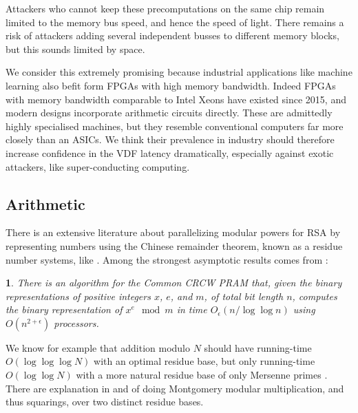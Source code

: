 \documentclass{article}
\newtheorem*{rawnamedtheorem}{\therawnamedtheorem}
\newcommand{\therawnamedtheorem}{\error}
\newenvironment{namedtheorem}[1]{\renewcommand{\therawnamedtheorem}{#1}
   \begin{rawnamedtheorem}}
  {\end{rawnamedtheorem}}
\begin{document}
Attackers who cannot keep these precomputations on the same chip remain
limited to the memory bus speed, and hence the speed of light. 
There remains a risk of attackers adding several independent busses to
different memory blocks, but this sounds limited by space.

We consider this extremely promising because industrial applications
like machine learning also befit form FPGAs with high memory bandwidth.
Indeed FPGAs with memory bandwidth comparable to Intel Xeons have
existed since 2015, and 
modern designs incorporate arithmetic circuits directly.
These are admittedly highly specialised machines, but they resemble
conventional computers far more closely than an ASICs.
We think their prevalence in industry should therefore increase
confidence in the VDF latency dramatically, especially against
exotic attackers, like super-conducting computing.

\subsection{Arithmetic}

There is an extensive literature about parallelizing modular powers
for RSA by representing numbers using the Chinese remainder theorem,
known as a residue number systems, like \cite{RNSonGPU07,Moss07,Araujo12}.
Among the strongest asymptotic results comes from \cite{BernsteinSorenson07}:

\begin{namedtheorem}{Theorem 8.1 of \cite{BernsteinSorenson07}}
There is an algorithm for the Common CRCW PRAM that, given the binary
representations of positive integers $x$, $e$, and $m$, of total bit
length $n$, computes the binary representation of $x^e \mod m$ in time
$O_\epsilon(n / \log \log n)$ using $O(n^{2+\epsilon})$ processors.
\end{namedtheorem}


We know for example that addition modulo $N$ should have running-time
$O(\log \log \log N)$ with an optimal residue base, but only
running-time $O(\log \log N)$ with a more natural residue base of only
Mersenne primes \cite[\S4.6]{Parhami}.
There are explanation in \cite{RNSonGPU07} and \cite{Araujo12} of
doing Montgomery modular multiplication, and thus squarings, over
two distinct residue bases. 
\end{document}
